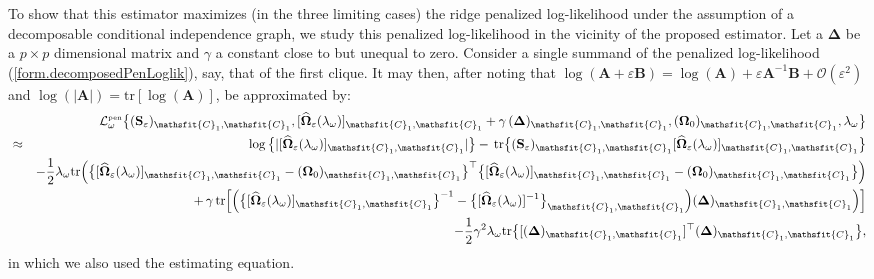\documentclass[a4paper]{article}
\begin{document}
To show that this estimator maximizes (in the three limiting cases) the ridge penalized log-likelihood under the assumption of a decomposable conditional independence graph, we study this penalized log-likelihood in the vicinity of the proposed estimator. Let a $\mathbf{\Delta}$ be a $p \times p$ dimensional matrix and $\gamma$ a constant close to but unequal to zero. Consider a single summand of the penalized log-likelihood (\ref{form.decomposedPenLoglik}), say, that of the first clique. It may then, after noting that $\log(\mathbf{A} + \varepsilon \mathbf{B}) = \log( \mathbf{A}) + \varepsilon \mathbf{A}^{-1} \mathbf{B} + \mathcal{O}(\varepsilon^2)$ and $\log( | \mathbf{A} |)  = \mbox{tr} [ \log(\mathbf{A})]$, be approximated by:
\begin{eqnarray*}
& & \hspace{-1cm} \mathcal{L}^{\mbox{{\tiny pen}}}_{\omega} \big\{ (\mathbf{S}_{\varepsilon})_{\mathsfit{C}_1,\mathsfit{C}_1}, [\widehat{\mathbf{\Omega}}_{\varepsilon}(\lambda_{\omega}) ]_{\mathsfit{C}_1,\mathsfit{C}_1} + \gamma \, (\mathbf{\Delta})_{\mathsfit{C}_1,\mathsfit{C}_1}, (\mathbf{\Omega}_{0})_{\mathsfit{C}_1,\mathsfit{C}_1}, \lambda_{\omega} \big\}
\\
& \approx & \log \big\{ | [\widehat{\mathbf{\Omega}}_{\varepsilon}(\lambda_{\omega}) ]_{\mathsfit{C}_1,\mathsfit{C}_1} | \big\}
 - \, \mbox{tr}  \big\{ (\mathbf{S}_{\varepsilon})_{\mathsfit{C}_1,\mathsfit{C}_1}  [\widehat{\mathbf{\Omega}}_{\varepsilon}(\lambda_{\omega})]_{\mathsfit{C}_1,\mathsfit{C}_1} \big\}
\\
& &
- \frac{1}{2} \lambda_{\omega} \mbox{tr}  \Big(  \big\{ [\widehat{\mathbf{\Omega}}_{\varepsilon}(\lambda_{\omega})]_{\mathsfit{C}_1,\mathsfit{C}_1} - (\mathbf{\Omega}_{0})_{\mathsfit{C}_1,\mathsfit{C}_1} \big\}^{\top} \big\{ [\widehat{\mathbf{\Omega}}_{\varepsilon}(\lambda_{\omega})]_{\mathsfit{C}_1,\mathsfit{C}_1} - (\mathbf{\Omega}_{0})_{\mathsfit{C}_1,\mathsfit{C}_1} \big\} \Big)
\\
& & + \, \gamma \, \mbox{tr} \Big[ \Big(
\big\{ [\widehat{\mathbf{\Omega}}_{\varepsilon}(\lambda_{\omega})]_{\mathsfit{C}_1,\mathsfit{C}_1} \big\}^{-1} -
\big\{ [\widehat{\mathbf{\Omega}}_{\varepsilon}(\lambda_{\omega})]^{-1} \big\}_{\mathsfit{C}_1,\mathsfit{C}_1}
\Big) ( \mathbf{\Delta})_{\mathsfit{C}_1,\mathsfit{C}_1} \Big) \Big]
\\
& & - \frac{1}{2} \gamma^2 \lambda_{\omega} \mbox{tr}  \big\{  [  (\mathbf{\Delta})_{\mathsfit{C}_1,\mathsfit{C}_1} ]^{\top}  ( \mathbf{\Delta})_{\mathsfit{C}_1,\mathsfit{C}_1}  \big\},
\end{eqnarray*}
in which we also used the estimating equation.
\end{document}
